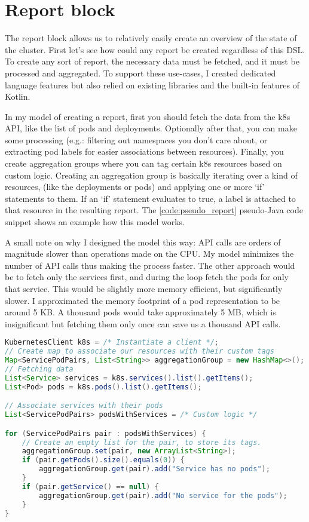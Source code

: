 \section{Report block}
\label{sec:report}

The report block allows us to relatively easily create an overview of the state of the cluster. First let's see how could any report be created regardless of this DSL. To create any sort of report, the necessary data must be fetched, and it must be processed and aggregated. To support these use-cases, I created dedicated language features but also relied on existing libraries and the built-in features of Kotlin.

In my model of creating a report, first you should fetch the data from the k8s API, like the list of pods and deployments. Optionally after that, you can make some processing (e.g.: filtering out namespaces you don't care about, or extracting pod labels for easier associations between resources). Finally, you create aggregation groups where you can tag certain k8s resources based on custom logic. Creating an aggregation group is basically iterating over a kind of resources, (like the deployments or pods) and applying one or more `if' statements to them. If an `if' statement evaluates to true, a label is attached to that resource in the resulting report. The \ref{code:pseudo_report} pseudo-Java code snippet shows an example how this model works.

A small note on why I designed the model this way: API calls are orders of magnitude slower than operations made on the CPU. My model minimizes the number of API calls thus making the process faster. The other approach would be to fetch only the services first, and during the loop fetch the pods for only that service. This would be slightly more memory efficient, but significantly slower. I approximated the memory footprint of a pod representation to be around 5 KB. A thousand pods would take approximately 5 MB, which is insignificant but fetching them only once can save us a thousand API calls.

\begin{minipage}{\linewidth}
\begin{lstlisting}[caption={Example report in pseudo-Java},language=Java,label=code:pseudo_report]
KubernetesClient k8s = /* Instantiate a client */;
// Create map to associate our resources with their custom tags
Map<ServicePodPairs, List<String>> aggregationGroup = new HashMap<>();
// Fetching data
List<Service> services = k8s.services().list().getItems();
List<Pod> pods = k8s.pods().list().getItems();

// Associate services with their pods
List<ServicePodPairs> podsWithServices = /* Custom logic */

for (ServicePodPairs pair : podsWithServices) {
    // Create an empty list for the pair, to store its tags.
    aggregationGroup.set(pair, new ArrayList<String>);
    if (pair.getPods().size().equals(0)) {
        aggregationGroup.get(pair).add("Service has no pods");
    }
    if (pair.getService() == null) {
        aggregationGroup.get(pair).add("No service for the pods");
    }
}
\end{lstlisting}
\end{minipage}

